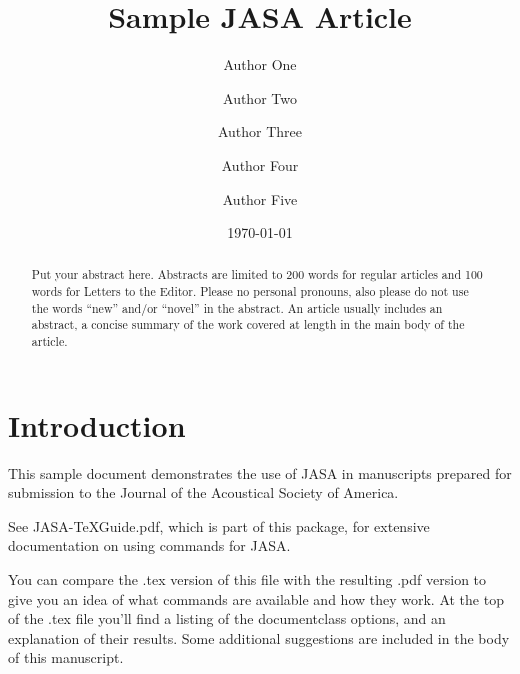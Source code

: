 \documentclass[preprint,trackchanges]{JASA}
\begin{document}
\title[JASA/Sample JASA Article]{Sample JASA Article}
\author{Author One}
\author{Author Two}
\author{Author Three}

\author{Author Four}
 
\author{Author Five}			


\date{\today} 

\begin{abstract}
Put your abstract here. Abstracts are limited to 200 words for
regular articles and 100 words for Letters to the Editor. Please no
personal pronouns, also please do not use the words ``new'' and/or
``novel'' in the abstract. An article usually includes an abstract, a
concise summary of the work covered at length in the main body of the
article.     
\end{abstract}


\maketitle



\section{\label{sec:1} Introduction}
This sample document demonstrates the use of JASA in manuscripts 
prepared for submission to the Journal of the Acoustical Society of America. 

See JASA-TeXGuide.pdf, which is part of this package, for extensive
documentation on using commands for JASA.

You can compare the .tex version of this file with the resulting .pdf
version to give you an idea of what  commands are available and how
they work. At the top of the .tex file you'll find a listing of the
documentclass options, and an explanation of their results.
Some additional suggestions are included in the body of this
manuscript.  
\end{document}
